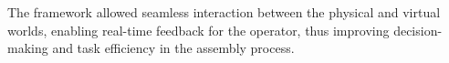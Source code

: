     The framework allowed seamless interaction between the physical and virtual worlds, enabling real-time feedback for the operator, thus improving decision-making and task efficiency in the assembly process.





    


    
    
